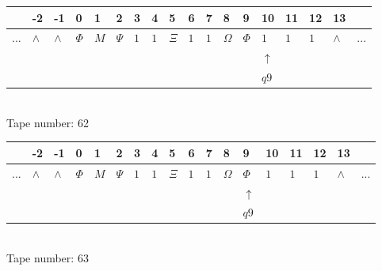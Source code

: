 \documentclass[11pt]{article}
\begin{document}
\begin{table}[H]
\centering
\begin{tabular}{llllllllllllllllll}
 & -2 & -1 & 0 & 1 & 2 & 3 & 4 & 5 & 6 & 7 & 8 & 9 & 10 & 11 & 12 & 13 & \\
\hline
$...$ & \multicolumn{1}{|l|}{$\wedge$} & \multicolumn{1}{|l|}{$\wedge$} & \multicolumn{1}{|l|}{$\Phi$} & \multicolumn{1}{|l|}{$M$} & \multicolumn{1}{|l|}{$\Psi$} & \multicolumn{1}{|l|}{$1$} & \multicolumn{1}{|l|}{$1$} & \multicolumn{1}{|l|}{$\Xi$} & \multicolumn{1}{|l|}{$1$} & \multicolumn{1}{|l|}{$1$} & \multicolumn{1}{|l|}{$\Omega$} & \multicolumn{1}{|l|}{$\Phi$} & \multicolumn{1}{|l|}{$1$} & \multicolumn{1}{|l|}{$1$} & \multicolumn{1}{|l|}{$1$} & \multicolumn{1}{|l|}{$\wedge$} & $...$\\
\hline
&  &  &  &  &  &  &  &  &  &  &  &  & $\uparrow$ &  &  &  &  \\
&  &  &  &  &  &  &  &  &  &  &  &  & $ q9 $ &  &  &  &  \\
\end{tabular}
\\
Tape number: 62
\noindent\makebox[\linewidth]{\hdashrule{\textwidth}{1pt}{1pt}}\end{table}

\begin{table}[H]
\centering
\begin{tabular}{llllllllllllllllll}
 & -2 & -1 & 0 & 1 & 2 & 3 & 4 & 5 & 6 & 7 & 8 & 9 & 10 & 11 & 12 & 13 & \\
\hline
$...$ & \multicolumn{1}{|l|}{$\wedge$} & \multicolumn{1}{|l|}{$\wedge$} & \multicolumn{1}{|l|}{$\Phi$} & \multicolumn{1}{|l|}{$M$} & \multicolumn{1}{|l|}{$\Psi$} & \multicolumn{1}{|l|}{$1$} & \multicolumn{1}{|l|}{$1$} & \multicolumn{1}{|l|}{$\Xi$} & \multicolumn{1}{|l|}{$1$} & \multicolumn{1}{|l|}{$1$} & \multicolumn{1}{|l|}{$\Omega$} & \multicolumn{1}{|l|}{$\Phi$} & \multicolumn{1}{|l|}{$1$} & \multicolumn{1}{|l|}{$1$} & \multicolumn{1}{|l|}{$1$} & \multicolumn{1}{|l|}{$\wedge$} & $...$\\
\hline
&  &  &  &  &  &  &  &  &  &  &  & $\uparrow$ &  &  &  &  &  \\
&  &  &  &  &  &  &  &  &  &  &  & $ q9 $ &  &  &  &  &  \\
\end{tabular}
\\
Tape number: 63
\noindent\makebox[\linewidth]{\hdashrule{\textwidth}{1pt}{1pt}}\end{table}
\end{document}
